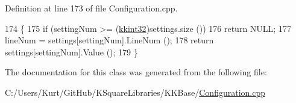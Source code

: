 Definition at line 173 of file Configuration.\+cpp.


\begin{DoxyCode}
174     \{
175       \textcolor{keywordflow}{if}  (settingNum >= (\hyperlink{namespace_k_k_b_a8fa4952cc84fda1de4bec1fbdd8d5b1b}{kkint32})settings.size ())
176         \textcolor{keywordflow}{return} NULL;
177       lineNum = settings[settingNum].LineNum ();
178       \textcolor{keywordflow}{return}  settings[settingNum].Value ();
179     \}
\end{DoxyCode}


The documentation for this class was generated from the following file\+:\begin{DoxyCompactItemize}
\item 
C\+:/\+Users/\+Kurt/\+Git\+Hub/\+K\+Square\+Libraries/\+K\+K\+Base/\hyperlink{_configuration_8cpp}{Configuration.\+cpp}\end{DoxyCompactItemize}
